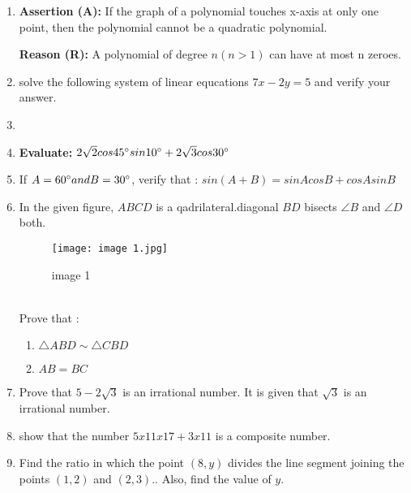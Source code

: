 \documentclass{article}
\begin{document}
\begin{enumerate}
\item \textbf{Assertion (A):} If the graph of a polynomial touches x-axis at only one point, then the polynomial cannot be a quadratic polynomial.

\textbf{Reason (R):} A polynomial of degree $n(n >1)$ can have at most n zeroes.
\item solve the following system of linear equcations $7x-2y=5$ and verify your answer.
\item{}

\item\textbf{ Evaluate:} $2\sqrt{2} cos 45\degree sin 10\degree + 2\sqrt{3} cos 30\degree$

\item If  $A = 60\degree and  B = 30\degree$, verify that : $sin(A + B) = sin A cos B + cos A sin B$
\newpage
\item In  the given figure, $ABCD$ is a qadrilateral.diagonal $BD$ bisects $\angle B$ and $\angle D$ both. 
\begin{figure}[!ht]
\centering
\texttt{[image: image 1.jpg]}
\label{fig:image 1}
\caption{image 1}
\end{figure}\\
\text Prove that :\\	
\begin{enumerate}	
\item$\triangle ABD \sim \triangle CBD $\\
\item $AB = BC$
\end{enumerate}
\item Prove that $ 5 - 2\sqrt{3}$ is an irrational number. It is given that $\sqrt{3}$  is an irrational number.

\item show that the number $5x11x17+3x11$ is a composite number.
\item Find the ratio in which the point $(8, y)$ divides the line segment joining the points $(1, 2)$ and $(2, 3)$.. Also, find the value of  $y$.


\end{enumerate}
\end{document}
